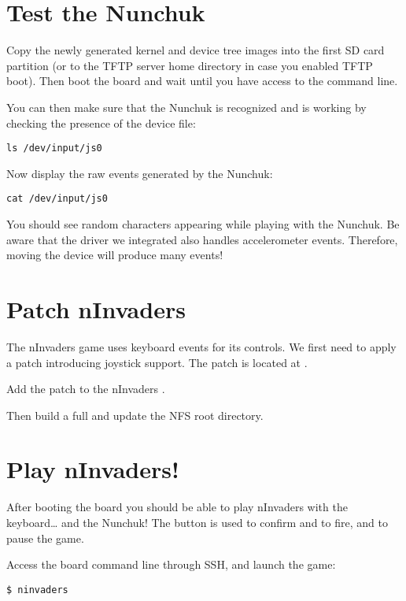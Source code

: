 \section{Test the Nunchuk}

Copy the newly generated kernel and device tree images into the first SD card
partition (or to the TFTP server home directory in case you enabled TFTP
boot). Then boot the board and wait until you have access to the
 command line.

You can then make sure that the Nunchuk is recognized and is working by
checking the presence of the  device file:
\begin{verbatim}
ls /dev/input/js0
\end{verbatim}

Now display the raw events generated by the Nunchuk:
\begin{verbatim}
cat /dev/input/js0
\end{verbatim}

You should see random characters appearing while playing with the Nunchuk.
{Be aware that the driver we integrated also handles accelerometer events.
Therefore, moving the device will produce many events!}

\section{Patch nInvaders}

The nInvaders game uses keyboard events for its controls. We first need to apply
a patch introducing joystick support. The patch is located at
.

Add the patch to the nInvaders .

Then build a full  and update the NFS root
directory.

\section{Play nInvaders!}

After booting the board you should be able to play nInvaders with the
keyboard\dots{} and the Nunchuk! The  button is used to confirm and to
fire, and  to pause the game.

Access the board command line through SSH, and launch the game:
\begin{verbatim}
$ ninvaders
\end{verbatim}
